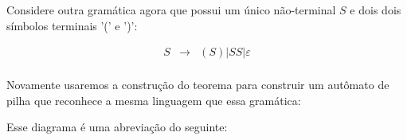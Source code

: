 \begin{example}
  Considere outra gramática agora que possui um único não-terminal $S$ e dois dois símbolos terminais '(' e ')':

  \begin{eqnarray*}
    S & \to & (S) | SS | \varepsilon \\
  \end{eqnarray*}

Novamente usaremos a construção do teorema para construir um autômato de pilha que reconhece a mesma linguagem que essa gramática:

  \begin{center}
  \end{center}

  Esse diagrama é uma abreviação do seguinte:


\end{example}
